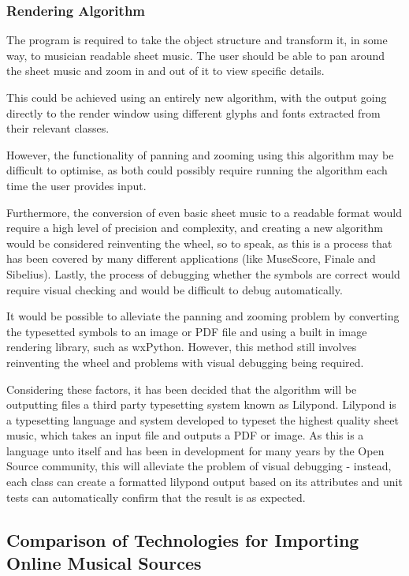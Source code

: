 \subsubsection{Rendering Algorithm}
The program is required to take the object structure and transform it, in some way, to musician readable sheet music. The user should be able to pan around the sheet music and zoom in and out of it to view specific details.

This could be achieved using an entirely new algorithm, with the output going directly to the render window using different glyphs and fonts extracted from their relevant classes.

However, the functionality of panning and zooming using this algorithm may be difficult to optimise, as both could possibly require running the algorithm each time the user provides input. 

Furthermore, the conversion of even basic sheet music to a readable format would require a high level of precision and complexity, and creating a new algorithm would be considered reinventing the wheel, so to speak, as this is a process that has been covered by many different applications (like MuseScore\parencite{MuseTour}, Finale\parencite{mxml} and Sibelius\parencite{avid}). 
Lastly, the process of debugging whether the symbols are correct would require visual checking and would be difficult to debug automatically.

It would be possible to alleviate the panning and zooming problem by converting the typesetted symbols to an image or PDF file and using a built in image rendering library, such as wxPython\parencite{WX}. However, this method still involves reinventing the wheel and problems with visual debugging being required.

Considering these factors, it has been decided that the algorithm will be outputting files a third party typesetting system known as Lilypond. Lilypond is a typesetting language and system developed to typeset the highest quality sheet music\parencite{Lilypond}, which takes an input file and outputs a PDF or image. As this is a language unto itself and has been in development for many years by the Open Source community, this will alleviate the problem of visual debugging - instead, each class can create a formatted lilypond output based on its attributes and unit tests can automatically confirm that the result is as expected.


\subsection{Comparison of Technologies for Importing Online Musical Sources}
